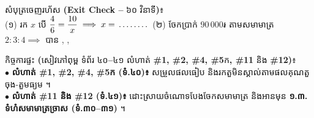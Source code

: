 \documentclass[a4paper,10pt]{article}
\newcommand{\en}[1]{{\TimesEn #1}}
\newcommand{\enbf}[1]{{\TimesEn\bfseries #1}}
\newcommand{\blank}[1][1.5cm]{\makebox[#1]{\dotfill}}
\begin{document}
\vspace{5pt}
\begin{tcolorbox}[enhanced, sharp corners, colback=white, colframe=black, boxrule=0.85pt, boxsep=2.5pt, top=3.5pt, bottom=3.5pt, left=5pt, right=5pt]
  {\muol\fontsize{8.8pt}{12.5pt}\selectfont សំបុត្រចេញរហ័ស \enbf{(Exit Check --} ៦០ វិនាទី\enbf{)}៖}\\[2pt]
  (១) រក $x$ បើ $\dfrac{4}{6} = \dfrac{10}{x} \implies x = \blank[1.3cm]$ \;\en{|}\;
  (២) ចែកប្រាក់ $90\,000\text{៛}$ តាមសមាមាត្រ $2:3:4 \implies$ បាន \blank[1.5cm], \blank[1.5cm], \blank[1.5cm]
\end{tcolorbox}

\vspace{5pt}
\begin{tcolorbox}[enhanced, sharp corners, colback=panelgray, colframe=black, boxrule=0.85pt, boxsep=2.5pt, top=3.5pt, bottom=3.5pt, left=5pt, right=5pt]
  {\muol\fontsize{8.8pt}{12.5pt}\selectfont កិច្ចការផ្ទះ \enbf{(}សៀវភៅពុម្ព ទំព័រ ៤០\enbf{--}៤១ លំហាត់ \enbf{\#1, \#2, \#4, \#5}ក\enbf{, \#11} និង \enbf{\#12)}៖}\\[2pt]
  $\bullet$ \textbf{លំហាត់ \#1, \#2, \#4, \#5ក (ទំ.៤០)៖} សម្រួលផលធៀប និងរកតួមិនស្គាល់តាមផលគុណតួចុង-តួមធ្យម ។\\
  $\bullet$ \textbf{លំហាត់ \#11 និង \#12 (ទំ.៤១)៖} ដោះស្រាយចំណោទបែងចែកសមាមាត្រ និងអានមុន \textbf{១.៣. ទំហំសមាមាត្រច្រាស (ទំ.៣០–៣១)} ។
\end{tcolorbox}
\end{document}
